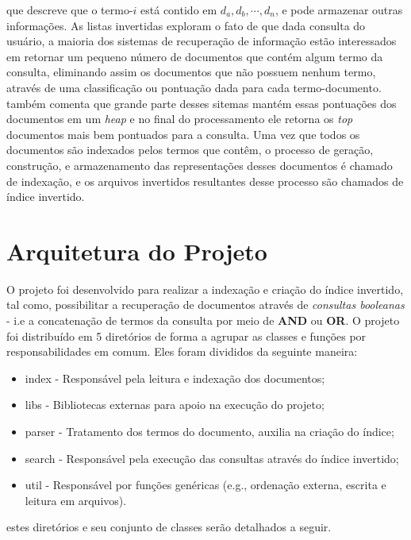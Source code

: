 \documentclass[12pt]{article}
\begin{document}
que descreve que o termo-{$i$} está contido em {$d_a, d_b, \cdots, d_n$}, e pode armazenar outras informações.
As listas invertidas exploram o fato de que dada consulta do usuário, a maioria dos sistemas de recuperação de informação estão interessados em retornar um pequeno número de documentos que contém algum termo da consulta, eliminando assim os documentos que não possuem nenhum termo, através de uma classificação ou pontuação dada para cada termo-documento. \cite{singhal2001modern} também comenta que grande parte desses sitemas mantém essas pontuações dos documentos em um \textit{heap} e no final do processamento ele retorna os \textit{top} documentos mais bem pontuados para a consulta. Uma vez que todos os documentos são indexados pelos termos que contêm, o processo de geração, construção, e armazenamento das representações desses documentos é chamado de indexação, e os arquivos invertidos resultantes desse processo são chamados de índice invertido.


\section{Arquitetura do Projeto} \label{sec:architeture}

O projeto foi desenvolvido para realizar a indexação e criação do índice invertido, tal como, possibilitar a recuperação de documentos através de \textit{consultas booleanas} - i.e a concatenação de termos da consulta por meio de \textbf{AND} ou \textbf{OR}. O projeto foi distribuído em 5 diretórios de forma a agrupar as classes e funções por responsabilidades em comum. Eles foram divididos da seguinte maneira:
\begin{itemize}
\item index - Responsável pela leitura e indexação dos documentos;
\item libs  - Bibliotecas externas para apoio na execução do projeto;
\item parser - Tratamento dos termos do documento, auxilia na criação do índice;
\item search - Responsável pela execução das consultas através do índice invertido;
\item util - Responsável por funções genéricas (e.g., ordenação externa, escrita e leitura em arquivos).
\end{itemize}

estes diretórios e seu conjunto de classes serão detalhados a seguir.
\end{document}
